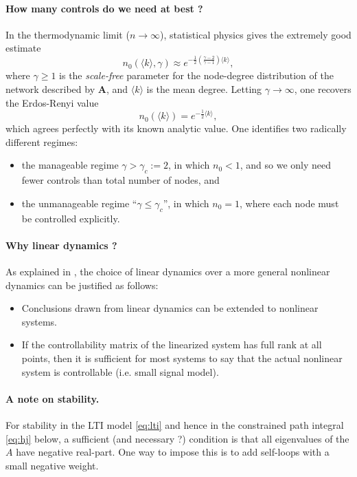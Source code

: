 \documentclass{article} %
\def\A{\mathbf{A}}
\begin{document}
\paragraph{How many controls do we need at best ?}
In the thermodynamic limit ($n \rightarrow \infty$), statistical physics \cite{Liu2011} gives the extremely good estimate
\begin{equation}
  n_0(\langle k\rangle, \gamma) \approx e^{-\frac{1}{2}\left(\frac{\gamma-2}{\gamma - 1}\right)\langle k \rangle},
\end{equation}
where $\gamma \ge 1$ is the \textit{scale-free} parameter for the node-degree distribution of the network described by $\A$, and $\langle k \rangle$ is the mean degree. Letting $\gamma \rightarrow \infty$, one recovers the Erdos-Renyi value
\begin{equation}
  n_0(\langle k\rangle) = e^{-\frac{1}{2}\langle k\rangle},
\end{equation}
which agrees perfectly with its known analytic value. One identifies two radically different regimes:
\begin{itemize}
  \item the manageable regime $\gamma > \gamma_c := 2$, in which $n_0 < 1$, and so we only need fewer controls than total number of nodes, and
\item the unmanageable regime ``$\gamma \le \gamma_c$'', in which  $n_0 = 1$, where each node must be controlled explicitly.
\end{itemize}

\paragraph{Why linear dynamics ?}
As explained in \cite{Liu2011}, the choice of linear dynamics over a more general nonlinear dynamics can be justified as follows:
\begin{itemize}
  \item  Conclusions drawn from linear dynamics can be
extended to nonlinear systems.
\item If the controllability matrix of the linearized system
has full rank at all points, then it is sufficient for most
systems to say that the actual nonlinear system is
controllable (i.e. small signal model).
\end{itemize}

\paragraph{A note on stability.}
For stability in the LTI model \eqref{eq:lti} and hence in the constrained path integral \eqref{eq:hj} below, a sufficient (and necessary ?) condition is that all eigenvalues of the $A$ have negative real-part. One way to impose this is to add self-loops with a small negative weight.
\end{document}
